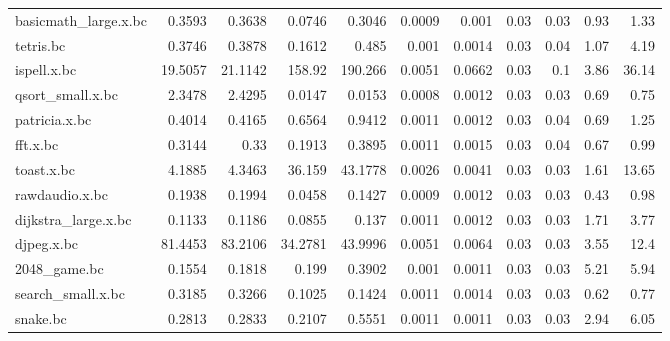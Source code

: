 \begin{tabular}{lrrrrrrrrrr}
 basicmath\_large.x.bc &          0.3593 &          0.3638 &   0.0746 &   0.3046 &   0.0009 &   0.001  &           0.03 &           0.03 &           0.93 &           1.33 \\
 tetris.bc            &          0.3746 &          0.3878 &   0.1612 &   0.485  &   0.001  &   0.0014 &           0.03 &           0.04 &           1.07 &           4.19 \\
 ispell.x.bc          &         19.5057 &         21.1142 & 158.92   & 190.266  &   0.0051 &   0.0662 &           0.03 &           0.1  &           3.86 &          36.14 \\
 qsort\_small.x.bc     &          2.3478 &          2.4295 &   0.0147 &   0.0153 &   0.0008 &   0.0012 &           0.03 &           0.03 &           0.69 &           0.75 \\
 patricia.x.bc        &          0.4014 &          0.4165 &   0.6564 &   0.9412 &   0.0011 &   0.0012 &           0.03 &           0.04 &           0.69 &           1.25 \\
 fft.x.bc             &          0.3144 &          0.33   &   0.1913 &   0.3895 &   0.0011 &   0.0015 &           0.03 &           0.04 &           0.67 &           0.99 \\
 toast.x.bc           &          4.1885 &          4.3463 &  36.159  &  43.1778 &   0.0026 &   0.0041 &           0.03 &           0.03 &           1.61 &          13.65 \\
 rawdaudio.x.bc       &          0.1938 &          0.1994 &   0.0458 &   0.1427 &   0.0009 &   0.0012 &           0.03 &           0.03 &           0.43 &           0.98 \\
 dijkstra\_large.x.bc  &          0.1133 &          0.1186 &   0.0855 &   0.137  &   0.0011 &   0.0012 &           0.03 &           0.03 &           1.71 &           3.77 \\
 djpeg.x.bc           &         81.4453 &         83.2106 &  34.2781 &  43.9996 &   0.0051 &   0.0064 &           0.03 &           0.03 &           3.55 &          12.4  \\
 2048\_game.bc         &          0.1554 &          0.1818 &   0.199  &   0.3902 &   0.001  &   0.0011 &           0.03 &           0.03 &           5.21 &           5.94 \\
 search\_small.x.bc    &          0.3185 &          0.3266 &   0.1025 &   0.1424 &   0.0011 &   0.0014 &           0.03 &           0.03 &           0.62 &           0.77 \\
 snake.bc             &          0.2813 &          0.2833 &   0.2107 &   0.5551 &   0.0011 &   0.0011 &           0.03 &           0.03 &           2.94 &           6.05 \\

\end{tabular}
